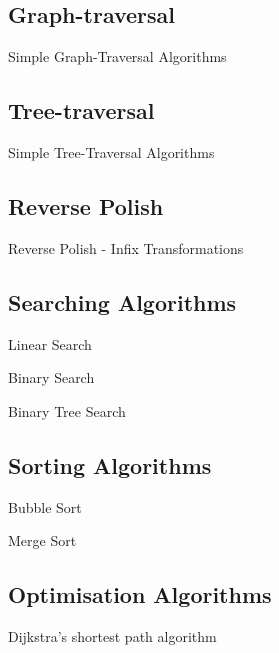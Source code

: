 \subsection{Graph-traversal}
  \noindent
  Simple Graph-Traversal Algorithms
\subsection{Tree-traversal}
  \noindent
  Simple Tree-Traversal Algorithms
\subsection{Reverse Polish}
  \noindent
  Reverse Polish - Infix Transformations
\subsection{Searching Algorithms}
  \noindent
  Linear Search

  \noindent
  Binary Search

  \noindent
  Binary Tree Search
\subsection{Sorting Algorithms}
  \noindent
  Bubble Sort

  \noindent
  Merge Sort
\subsection{Optimisation Algorithms}
  \noindent
  Dijkstra's shortest path algorithm
